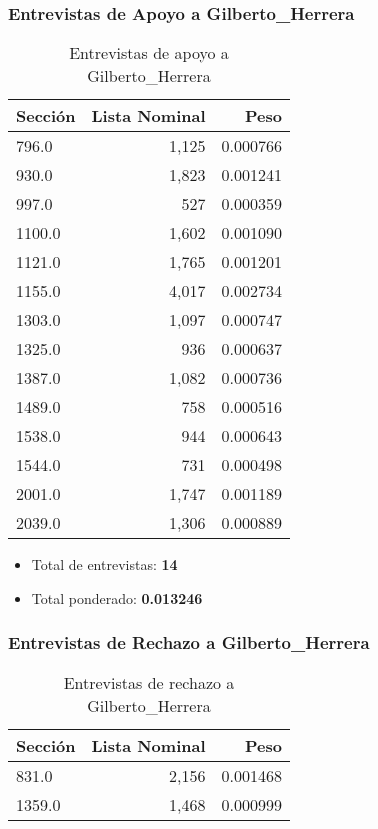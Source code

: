 \documentclass[a4paper,12pt]{article}
\begin{document}
\subsubsection*{Entrevistas de Apoyo a Gilberto_Herrera}
\begin{table}[h]
\centering
\begin{tabular}{lrr}
\toprule
Sección & Lista Nominal & Peso \\ \midrule
796.0 & 1,125 & 0.000766 \\ 
930.0 & 1,823 & 0.001241 \\ 
997.0 & 527 & 0.000359 \\ 
1100.0 & 1,602 & 0.001090 \\ 
1121.0 & 1,765 & 0.001201 \\ 
1155.0 & 4,017 & 0.002734 \\ 
1303.0 & 1,097 & 0.000747 \\ 
1325.0 & 936 & 0.000637 \\ 
1387.0 & 1,082 & 0.000736 \\ 
1489.0 & 758 & 0.000516 \\ 
1538.0 & 944 & 0.000643 \\ 
1544.0 & 731 & 0.000498 \\ 
2001.0 & 1,747 & 0.001189 \\ 
2039.0 & 1,306 & 0.000889 \\ 
\bottomrule
\end{tabular}
\caption{Entrevistas de apoyo a Gilberto_Herrera}
\end{table}

\begin{itemize}
\item Total de entrevistas: \textbf{14}
\item Total ponderado: \textbf{0.013246}
\end{itemize}

\subsubsection*{Entrevistas de Rechazo a Gilberto_Herrera}
\begin{table}[h]
\centering
\begin{tabular}{lrr}
\toprule
Sección & Lista Nominal & Peso \\ \midrule
831.0 & 2,156 & 0.001468 \\ 
1359.0 & 1,468 & 0.000999 \\ 
\bottomrule
\end{tabular}
\caption{Entrevistas de rechazo a Gilberto_Herrera}
\end{table}
\end{document}
